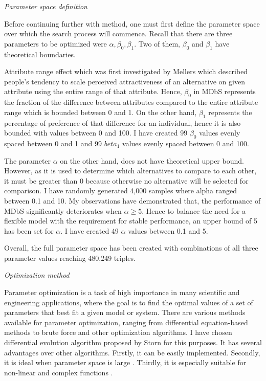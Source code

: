 \documentclass[a4paper,12pt]{article}
\newcommand{\citeyearonly}[1]{\citeyearpar{#1}}
\begin{document}
\textit{Parameter space definition}

Before continuing further with method, one must first define the parameter space over which the search process will commence. Recall that there are three parameters to be optimized were $\alpha, \beta_0, \beta_1$. Two of them, $\beta_0$ and $\beta_1$ have theoretical boundaries. 

Attribute range effect which was first investigated by Mellers \citeyearonly{mellers1994trade} which described people's tendency to scale perceived attractiveness of an alternative on given attribute using the entire range of that attribute. Hence, $\beta_0$ in MDbS represents the fraction of the difference between attributes compared to the entire attribute range which is bounded between 0 and 1. On the other hand, $\beta_1$ represents the percentage of preference of that difference for an individual, hence it is also bounded with values between 0 and 100. I have created 99 $\beta_0$ values evenly spaced between 0 and 1 and 99 $beta_1$ values evenly spaced between 0 and 100.

The parameter $\alpha$ on the other hand, does not have theoretical upper bound. However, as it is used to determine which alternatives to compare to each other, it must be greater than 0 because otherwise no alternative will be selected for comparison. I have randomly generated 4,000 samples where alpha ranged between 0.1 and 10. My observations have demonstrated that, the performance of MDbS significantly deteriorates when $\alpha \ge 5$. Hence to balance the need for a flexible model with the requirement for stable performance, an upper bound of 5 has been set for $\alpha$. I have created 49 $\alpha$ values between 0.1 and 5.

Overall, the full parameter space has been created with combinations of all three parameter values reaching 480,249 triples.

\textit{Optimization method}

Parameter optimization is a task of high importance in many scientific and engineering applications, where the goal is to find the optimal values of a set of parameters that best fit a given model or system. There are various methods available for parameter optimization, ranging from differential equation-based methods to brute force and other optimization algorithms. I have chosen differential evolution algorithm proposed by Storn \citeyearonly{storn1997differential} for this purposes. It has several advantages over other algorithms. Firstly, it can be easily implemented. Secondly, it is ideal when parameter space is large \citep{lin2019applying}. Thirdly, it is  especially suitable for non-linear and complex functions \citep{omran2009bare}. 
\end{document}
